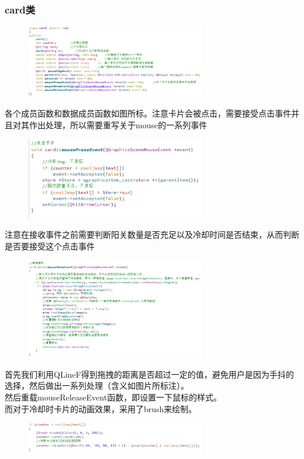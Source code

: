 \documentclass[12pt,a4paper,UTF8]{article}
\begin{document}
    \subsubsection{card类}
    \begin{figure}[H]
      \centering
    \includegraphics[width=0.7\textwidth]{figure/card.png}
    \end{figure}
    各个成员函数和数据成员函数如图所标。注意卡片会被点击，需要接受点击事件并且对其作出处理，所以需要重写关于mouse的一系列事件
    \begin{figure}[H]
      \centering
    \includegraphics[width=0.7\textwidth]{figure/mousepress.png}
    \end{figure}
    注意在接收事件之前需要判断阳关数量是否充足以及冷却时间是否结束，从而判断是否要接受这个点击事件
    \begin{figure}[H]
      \centering
    \includegraphics[width=0.7\textwidth]{figure/mousemove.png}
    \end{figure}
    首先我们利用QLineF得到拖拽的距离是否超过一定的值，避免用户是因为手抖的选择，然后做出一系列处理（含义如图片所标注）。\\
    然后重载mouseReleaseEvent函数，即设置一下鼠标的样式。\\
    而对于冷却时卡片的动画效果，采用了brush来绘制。
    \begin{figure}[H]
      \centering
    \includegraphics[width=0.7\textwidth]{figure/brush.png}
    \end{figure}
\end{document}
